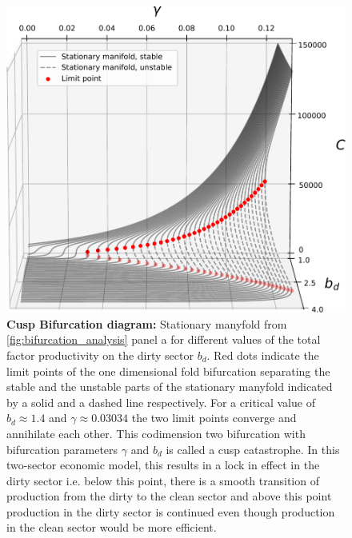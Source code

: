\begin{figure}[ht!]
\centering\includegraphics[width=\linewidth]{figures/cusp_better.pdf}
\caption{\textbf{Cusp Bifurcation diagram:}
Stationary manyfold from \cref{fig:bifurcation_analysis} panel a for different values of the total factor productivity on the dirty sector $b_d$. Red dots indicate the limit points of the one dimensional fold bifurcation separating the stable and the unstable parts of the stationary manyfold indicated by a solid and a dashed line respectively. For a critical value of $b_d \approx 1.4$ and $\gamma \approx 0.03034$ the two limit points converge and annihilate each other. This codimension two bifurcation with bifurcation parameters $\gamma$ and $b_d$ is called a cusp catastrophe. In this two-sector economic model, this results in a lock in effect in the dirty sector i.e. below this point, there is a smooth transition of production from the dirty to the clean sector and above this point production in the dirty sector is continued even though production in the clean sector would be more efficient. \label{fig:cusp}}
\end{figure}

